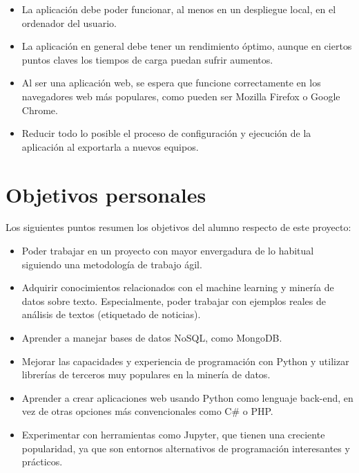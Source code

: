 \begin{itemize}

\item La aplicación debe poder funcionar, al menos en un despliegue local, en el ordenador del usuario.

\item La aplicación en general debe tener un rendimiento óptimo, aunque en ciertos puntos claves los tiempos de carga puedan sufrir aumentos.

\item Al ser una aplicación web, se espera que funcione correctamente en los navegadores web más populares, como pueden ser Mozilla Firefox o Google Chrome.

\item Reducir todo lo posible el proceso de configuración y ejecución de la aplicación al exportarla a nuevos equipos.

\end{itemize}

\section{Objetivos personales}

Los siguientes puntos resumen los objetivos del alumno respecto de este proyecto:

\begin{itemize}

\item Poder trabajar en un proyecto con mayor envergadura de lo habitual siguiendo una metodología de trabajo ágil.

\item Adquirir conocimientos relacionados con el machine learning y minería de datos sobre texto. Especialmente, poder trabajar con ejemplos reales de análisis de textos (etiquetado de noticias).

\item Aprender a manejar bases de datos NoSQL, como MongoDB.

\item Mejorar las capacidades y experiencia de programación con Python y utilizar librerías de terceros muy populares en la minería de datos.

\item Aprender a crear aplicaciones web usando Python como lenguaje back-end, en vez de otras opciones más convencionales como C\# o PHP.

\item Experimentar con herramientas como Jupyter, que tienen una creciente popularidad, ya que son entornos alternativos de programación interesantes y prácticos.


\end{itemize}
